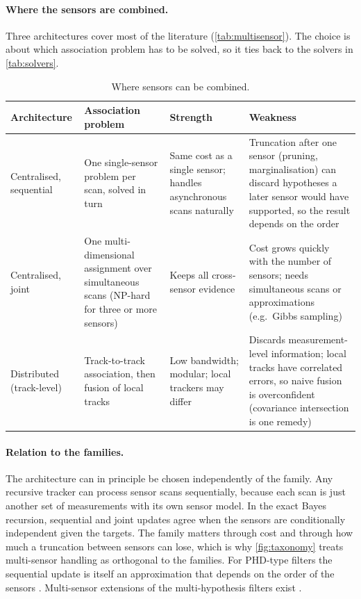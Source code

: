 \paragraph{Where the sensors are combined.} Three architectures cover most of the literature (\autoref{tab:multisensor}). The choice is about which association problem has to be solved, so it ties back to the solvers in \autoref{tab:solvers}.

\begin{table}[htbp]
\centering\small
\caption{Where sensors can be combined.
  }
\label{tab:multisensor}
\begin{tabularx}{\textwidth}{>{\raggedright\arraybackslash}p{2.6cm} >{\raggedright\arraybackslash}p{3.8cm} X X}
\toprule
Architecture & Association problem & Strength & Weakness \\
\midrule
Centralised, sequential
  & One single-sensor problem per scan, solved in turn
  & Same cost as a single sensor; handles asynchronous scans naturally
  & Truncation after one sensor (pruning, marginalisation) can discard hypotheses a later sensor would have supported, so the result depends on the order \\ \addlinespace
Centralised, joint
  & One multi-dimensional assignment over simultaneous scans (NP-hard for three or more sensors)
  & Keeps all cross-sensor evidence
  & Cost grows quickly with the number of sensors; needs simultaneous scans or approximations (e.g.\ Gibbs sampling) \\ \addlinespace
Distributed (track-level)
  & Track-to-track association, then fusion of local tracks
  & Low bandwidth; modular; local trackers may differ
  & Discards measurement-level information; local tracks have correlated errors, so naive fusion is overconfident (covariance intersection is one remedy) \\
\bottomrule
\end{tabularx}
\end{table}

\paragraph{Relation to the families.} The architecture can in principle be chosen independently of the family. Any recursive tracker can process sensor scans sequentially, because each scan is just another set of measurements with its own sensor model. In the exact Bayes recursion, sequential and joint updates agree when the sensors are conditionally independent given the targets. The family matters through cost and through how much a truncation between sensors can lose, which is why \autoref{fig:taxonomy} treats multi-sensor handling as orthogonal to the families. For PHD-type filters the sequential update is itself an approximation that depends on the order of the sensors . Multi-sensor extensions of the multi-hypothesis filters exist .

